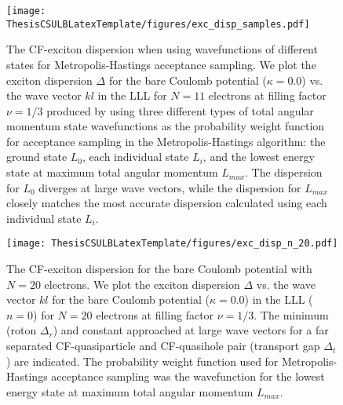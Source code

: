     \begin{figure}[H]
    \begin{center}
    \texttt{[image: ThesisCSULBLatexTemplate/figures/exc\_disp\_samples.pdf]}
    \caption[The CF-exciton dispersion when using wavefunctions of different states for Metropolis-Hastings acceptance sampling.]{The CF-exciton dispersion when using wavefunctions of different states for Metropolis-Hastings acceptance sampling. We plot the exciton dispersion $\Delta$ for the bare Coulomb potential ($\kappa=0.0$) vs. the wave vector $kl$ in the LLL for $N=11$ electrons at filling factor $\nu=1/3$ produced by using three different types of total angular momentum state wavefunctions as the probability weight function for acceptance sampling in the Metropolis-Hastings algorithm: the ground state $L_0$, each individual state $L_i$, and the lowest energy state at maximum total angular momentum $L_{max}$. The dispersion for $L_0$ diverges at large wave vectors, while the dispersion for $L_{max}$ closely matches the most accurate dispersion calculated using each individual state $L_i$.}
    \label{fig:exc_disp_samples} 
    \end{center}
    \end{figure}

    \begin{figure}[p]
    \begin{center}
    \texttt{[image: ThesisCSULBLatexTemplate/figures/exc\_disp\_n\_20.pdf]}
    \caption[The CF-exciton dispersion for the bare Coulomb potential with $N=20$ electrons.]{The CF-exciton dispersion for the bare Coulomb potential with $N=20$ electrons. We plot the exciton dispersion $\Delta$ vs. the wave vector $kl$ for the bare Coulomb potential ($\kappa=0.0$) in the LLL ($n=0$) for $N=20$ electrons at filling factor $\nu=1/3$. The minimum (roton $\Delta_r$) and constant approached at large wave vectors for a far separated CF-quasiparticle and CF-quasihole pair (transport gap $\Delta_t$) are indicated. The probability weight function used for Metropolis-Hastings acceptance sampling was the wavefunction for the lowest energy state at maximum total angular momentum $L_{max}$.}
    \label{fig:exc_disp_n_20} 
    \end{center}
    \end{figure}

\singlespacing
